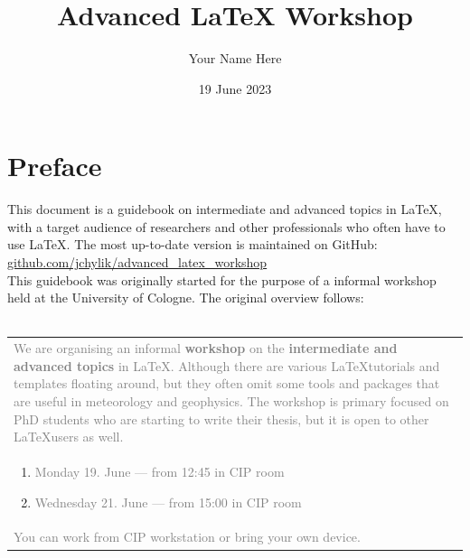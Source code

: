 \documentclass[a4paper,10pt]{report} %
\title{Advanced LaTeX Workshop}
\author{Your Name Here}
\date{19 June 2023}
\begin{document}


 \pagestyle{fancy}

 \section*{Preface} 
 
 This document is a guidebook on intermediate and advanced topics in \LaTeX, with a target audience of researchers and other professionals who often have to use \LaTeX. The most up-to-date version is maintained on GitHub: \href{https://github.com/jchylik/advanced_latex_workshop}{github.com/jchylik/advanced\_latex\_workshop} \\
 
 
 This guidebook was originally started for the purpose of a informal workshop held at the University of Cologne. 
 The original overview follows: 
 \\~\vspace{5ex}
 
\begin{tabular}{|p{}}
 \textcolor{gray}{
 We are organising an informal \textbf{workshop} on the \textbf{intermediate and advanced topics} in \LaTeX.
Although there are various \LaTeX tutorials and templates floating around, but they often omit some tools and packages that are useful in meteorology and geophysics. The workshop is primary focused on PhD students who are starting to write their thesis, but it is open to other \LaTeX users as well.}
\\
 \begin{enumerate}
 \item   \textcolor{gray}{Monday 19. June --- from 12:45 in CIP room}
 \item   \textcolor{gray}{Wednesday 21. June --- from 15:00 in CIP room} 
\end{enumerate}\\


\noindent
 \textcolor{gray}{ You can work from CIP workstation or bring your own device.}~\vspace{3ex}\\
\end{tabular}
 
\end{document}

